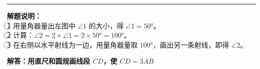 \vspace{1cm}
\hrule
\vspace{0.4cm}

{\small\color{gray}
\textbf{解题说明：}\\
\textcircled{1} 用量角器量出左图中 $\angle 1$ 的大小，得 $\angle 1 = 50°$。\\
\textcircled{2} 计算：$\angle 2 = 2 \times \angle 1 = 2 \times 50° = 100°$。\\
\textcircled{3} 在右侧以水平射线为一边，用量角器量取 $100°$，画出另一条射线，即得 $\angle 2$。
}




\newpage

\begin{center}
  {\large\bfseries 解答：用直尺和圆规画线段 $CD$，使 $CD = 3AB$}
\end{center}

\vspace{0.6cm}

